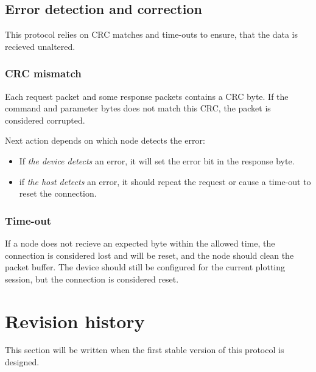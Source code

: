 \documentclass[11pt,a4paper,oneside]{memoir}
\begin{document}
\section{Error detection and correction}

This protocol relies on CRC matches and time-outs to ensure, that the
data is recieved unaltered.


\subsection{CRC mismatch}

Each request packet and some response packets contains a CRC byte. If
the command and parameter bytes does not match this CRC, the packet is
considered corrupted.

Next action depends on which node detects the error:
\begin{itemize} \firmlist
\item If \textit{the device detects} an error, it will set the error
  bit in the response byte.
\item if \textit{the host detects} an error, it should repeat the
  request or cause a time-out to reset the connection.
\end{itemize}

\subsection{Time-out}

If a node does not recieve an expected byte within the allowed time,
the connection is considered lost and will be reset, and the node
should clean the packet buffer. The device should still be configured
for the current plotting session, but the connection is considered
reset.



\chapter{Revision history}

This section will be written when the first stable version of this
protocol is designed.
\end{document}
